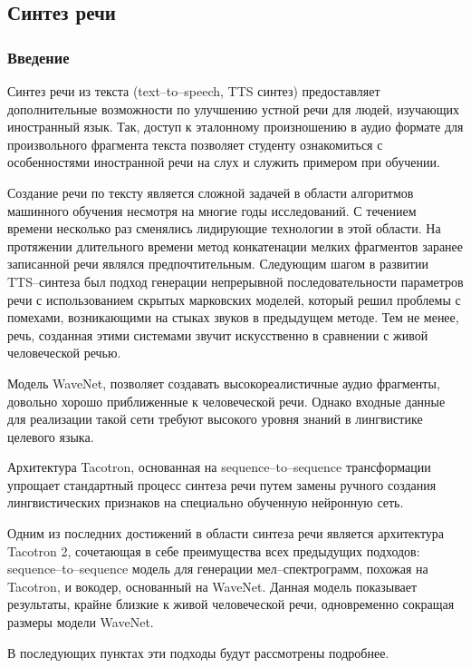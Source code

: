 \subsection{Синтез речи}
\subsubsection{Введение}
Синтез речи из текста (text--to--speech, TTS синтез) предоставляет дополнительные возможности по улучшению устной речи для людей, изучающих иностранный язык. Так, доступ к эталонному произношению в аудио формате для произвольного фрагмента текста позволяет студенту ознакомиться с особенностями иностранной речи на слух и служить примером при обучении.

Создание речи по тексту является сложной задачей в области алгоритмов машинного обучения несмотря на многие годы исследований\cite{taylor2009text}. С течением времени несколько раз сменялись лидирующие технологии в этой области. На протяжении длительного времени метод конкатенации мелких фрагментов заранее записанной речи\cite{hunt1996unit} являлся предпочтительным. Следующим шагом в развитии TTS--синтеза был подход генерации непрерывной последовательности параметров речи с использованием скрытых марковских моделей\cite{tokuda2000speech}, который решил проблемы с помехами, возникающими на стыках звуков в предыдущем методе. Тем не менее, речь, созданная этими системами звучит искусственно в сравнении с живой человеческой речью.

Модель WaveNet\cite{oord2016wavenet}, позволяет создавать высокореалистичные аудио фрагменты, довольно хорошо приближенные к человеческой речи. Однако входные данные для реализации такой сети требуют высокого уровня знаний в лингвистике целевого языка.

Архитектура Tacotron, основанная на sequence--to--sequence трансформации упрощает стандартный процесс синтеза речи путем замены ручного создания лингвистических признаков на специально обученную нейронную сеть.

Одним из последних достижений в области синтеза речи является архитектура Tacotron 2\cite{shen2018natural}, сочетающая в себе преимущества всех предыдущих подходов: sequence--to--sequence модель для генерации мел--спектро\-грамм, похожая на Tacotron, и вокодер, основанный на WaveNet. Данная модель показывает результаты, крайне близкие к живой человеческой речи, одновременно сокращая размеры модели WaveNet.

В последующих пунктах эти подходы будут рассмотрены подробнее.


